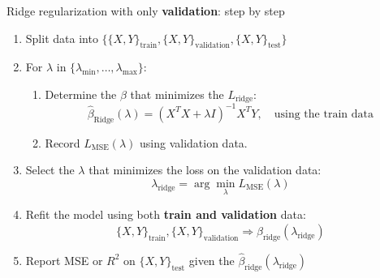 \begin{frame}{Ridge regularization with only \textbf{validation}: step by step}
\begin{enumerate}
  \item Split data into $\{\{X, Y\}_{\text{train}}, \{X, Y\}_{\text{validation}}, \{X, Y\}_{\text{test}}\}$
  
  \item For $\lambda$ in $\{\lambda_{\min}, \dots, \lambda_{\max}\}$:
  \begin{enumerate}
    \item Determine the $\beta$ that minimizes the $L_{\text{ridge}}$:
    \[
    \hat{\beta}_{\text{Ridge}}(\lambda) = (X^T X + \lambda I)^{-1} X^T Y, \quad \text{using the train data}
    \]
    \item Record $L_{\text{MSE}}(\lambda)$ using validation data.
  \end{enumerate}
  
  \item Select the $\lambda$ that minimizes the loss on the validation data:
  \[
  \lambda_{\text{ridge}} = \arg\min_{\lambda} L_{\text{MSE}}(\lambda)
  \]
  
  \item Refit the model using both \textbf{train and validation} data:
  \[
  \{X, Y\}_{\text{train}}, \{X, Y\}_{\text{validation}} \Rightarrow \hat{\beta}_{\text{ridge}}(\lambda_{\text{ridge}})
  \]
  
  \item Report MSE or $R^2$ on $\{X, Y\}_{\text{test}}$ given the $\hat{\beta}_{\text{ridge}}(\lambda_{\text{ridge}})$
\end{enumerate}
\end{frame}


